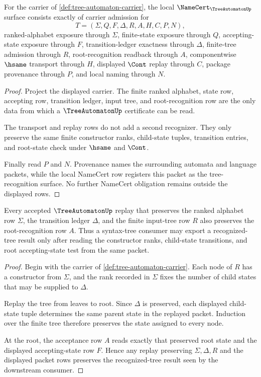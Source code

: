 \begin{theorem}
\label{thm:tree-automaton-namecert-obligations}
For the carrier of \autoref{def:tree-automaton-carrier}, the local $\NameCert_{\TreeAutomatonUp}$ surface consists exactly of carrier admission for
$$
T=(\Sigma,Q,F,\Delta,R,A,H,C,P,N),
$$
ranked-alphabet exposure through $\Sigma$, finite-state exposure through $Q$, accepting-state exposure through $F$, transition-ledger exactness through $\Delta$, finite-tree admission through $R$, root-recognition readback through $A$, componentwise $\hsame$ transport through $H$, displayed $\Cont$ replay through $C$, package provenance through $P$, and local naming through $N$.
\end{theorem}

\begin{proof}
Project the displayed carrier. The finite ranked alphabet, state row, accepting row, transition ledger, input tree, and root-recognition row are the only data from which a $\TreeAutomatonUp$ certificate can be read.

The transport and replay rows do not add a second recognizer. They only preserve the same finite constructor ranks, child-state tuples, transition entries, and root-state check under $\hsame$ and $\Cont$.

Finally read $P$ and $N$. Provenance names the surrounding automata and language packets, while the local NameCert row registers this packet as the tree-recognition surface. No further NameCert obligation remains outside the displayed rows.
\end{proof}

\begin{theorem}
\label{thm:tree-automaton-recognition-stability}
Every accepted $\TreeAutomatonUp$ replay that preserves the ranked alphabet row $\Sigma$, the transition ledger $\Delta$, and the finite input-tree row $R$ also preserves the root-recognition row $A$. Thus a syntax-tree consumer may export a recognized-tree result only after reading the constructor ranks, child-state transitions, and root accepting-state test from the same packet.
\end{theorem}

\begin{proof}
Begin with the carrier of \autoref{def:tree-automaton-carrier}. Each node of $R$ has a constructor from $\Sigma$, and the rank recorded in $\Sigma$ fixes the number of child states that may be supplied to $\Delta$.

Replay the tree from leaves to root. Since $\Delta$ is preserved, each displayed child-state tuple determines the same parent state in the replayed packet. Induction over the finite tree therefore preserves the state assigned to every node.

At the root, the acceptance row $A$ reads exactly that preserved root state and the displayed accepting-state row $F$. Hence any replay preserving $\Sigma,\Delta,R$ and the displayed packet rows preserves the recognized-tree result seen by the downstream consumer.
\end{proof}

